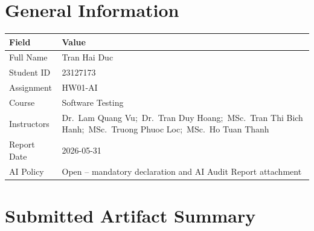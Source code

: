 \documentclass[12pt, a4paper]{article}
\begin{document}
\section{General Information}

\begin{table}[h!]
\centering
\begin{tabularx}{\textwidth}{@{} L{4cm} X @{}}
\toprule
{}
\textbf{Field} & \textbf{Value} \\
\midrule
Full Name       & Tran Hai Duc \\
Student ID      & 23127173 \\
Assignment      & HW01-AI \\
Course          & Software Testing \\
Instructors     & Dr.\ Lam Quang Vu;\ Dr.\ Tran Duy Hoang;\ MSc.\ Tran Thi Bich Hanh;\ MSc.\ Truong Phuoc Loc;\ MSc.\ Ho Tuan Thanh \\
Report Date     & 2026-05-31 \\
AI Policy       & Open -- mandatory declaration and AI Audit Report attachment \\
\bottomrule
\end{tabularx}
\end{table}

\section{Submitted Artifact Summary}
\end{document}
